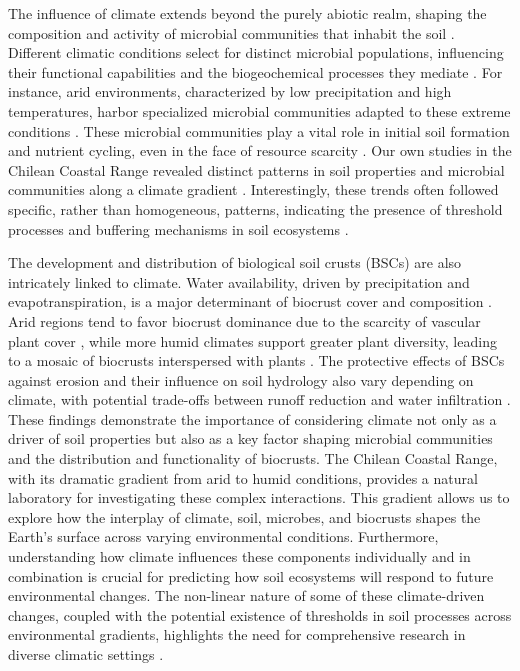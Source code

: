 The influence of climate extends beyond the purely abiotic realm, shaping the composition and activity of microbial communities that inhabit the soil \citep{Nemergut2005}. Different climatic conditions select for distinct microbial populations, influencing their functional capabilities and the biogeochemical processes they mediate \citep{Newsham2016}. For instance, arid environments, characterized by low precipitation and high temperatures, harbor specialized microbial communities adapted to these extreme conditions \citep{Pearce2012}. These microbial communities play a vital role in initial soil formation and nutrient cycling, even in the face of resource scarcity \citep{Bernhard2018}. Our own studies in the Chilean Coastal Range revealed distinct patterns in soil properties and microbial communities along a climate gradient \citep{Bernhard2018}. Interestingly, these trends often followed specific, rather than homogeneous, patterns, indicating the presence of threshold processes and buffering mechanisms in soil ecosystems \citep{Bernhard2018}.

The development and distribution of biological soil crusts (BSCs) are also intricately linked to climate. Water availability, driven by precipitation and evapotranspiration, is a major determinant of biocrust cover and composition \citep{Bowker2016}. Arid regions tend to favor biocrust dominance due to the scarcity of vascular plant cover \citep{Colesie2016,Grote2010}, while more humid climates support greater plant diversity, leading to a mosaic of biocrusts interspersed with plants \citep{Issa1999}. The protective effects of BSCs against erosion and their influence on soil hydrology also vary depending on climate, with potential trade-offs between runoff reduction and water infiltration \citep{Thielen2021}. These findings demonstrate the importance of considering climate not only as a driver of soil properties but also as a key factor shaping microbial communities and the distribution and functionality of biocrusts. The Chilean Coastal Range, with its dramatic gradient from arid to humid conditions, provides a natural laboratory for investigating these complex interactions. This gradient allows us to explore how the interplay of climate, soil, microbes, and biocrusts shapes the Earth’s surface across varying environmental conditions. Furthermore, understanding how climate influences these components individually and in combination is crucial for predicting how soil ecosystems will respond to future environmental changes. The non-linear nature of some of these climate-driven changes, coupled with the potential existence of thresholds in soil processes across environmental gradients, highlights the need for comprehensive research in diverse climatic settings \citep{Bernhard2018}.

